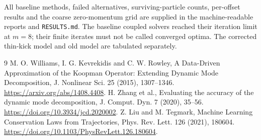 \documentclass[11pt]{article}
\begin{document}
All baseline methods, failed alternatives, surviving-particle counts, per-offset results and the coarse zero-momentum grid are supplied in the machine-readable reports and \texttt{RESULTS.md}. The baseline coupled solvers reached their iteration limit at $m=8$; their finite iterates must not be called converged optima. The corrected thin-kick model and old model are tabulated separately.

\begin{thebibliography}{9}
 M. O. Williams, I. G. Kevrekidis and C. W. Rowley, A Data-Driven Approximation of the Koopman Operator: Extending Dynamic Mode Decomposition, J. Nonlinear Sci. 25 (2015), 1307--1346. \url{https://arxiv.org/abs/1408.4408}.
 H. Zhang et al., Evaluating the accuracy of the dynamic mode decomposition, J. Comput. Dyn. 7 (2020), 35--56. \url{https://doi.org/10.3934/jcd.2020002}.
 Z. Liu and M. Tegmark, Machine Learning Conservation Laws from Trajectories, Phys. Rev. Lett. 126 (2021), 180604. \url{https://doi.org/10.1103/PhysRevLett.126.180604}.
\end{thebibliography}
\end{document}

